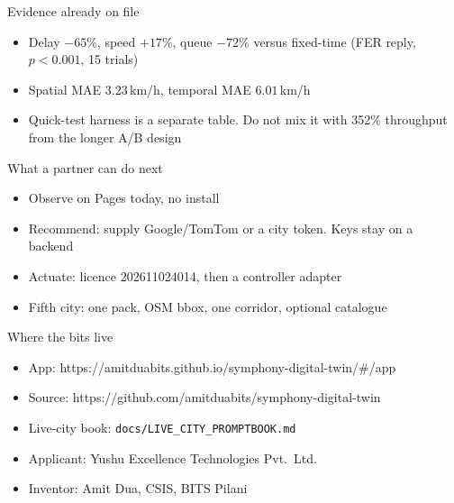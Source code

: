 \documentclass[aspectratio=169,11pt]{beamer}
\begin{document}
\begin{frame}{Evidence already on file}
\begin{itemize}\itemsep0.7em
\item Delay $-65\%$, speed $+17\%$, queue $-72\%$ versus fixed-time
      (FER reply, $p<0.001$, 15 trials)
\item Spatial MAE $3.23$\,km/h, temporal MAE $6.01$\,km/h
\item Quick-test harness is a separate table. Do not mix it with 352\%
      throughput from the longer A/B design
\end{itemize}
\end{frame}

\begin{frame}{What a partner can do next}
\begin{itemize}\itemsep0.7em
\item Observe on Pages today, no install
\item Recommend: supply Google/TomTom or a city token. Keys stay on a backend
\item Actuate: licence 202611024014, then a controller adapter
\item Fifth city: one pack, OSM bbox, one corridor, optional catalogue
\end{itemize}
\end{frame}

\begin{frame}{Where the bits live}
\begin{itemize}\itemsep0.7em
\item App: https://amitduabits.github.io/symphony-digital-twin/\#/app
\item Source: https://github.com/amitduabits/symphony-digital-twin
\item Live-city book: \texttt{docs/LIVE\_CITY\_PROMPTBOOK.md}
\item Applicant: Yushu Excellence Technologies Pvt.\ Ltd.
\item Inventor: Amit Dua, CSIS, BITS Pilani
\end{itemize}
\end{frame}
\end{document}
